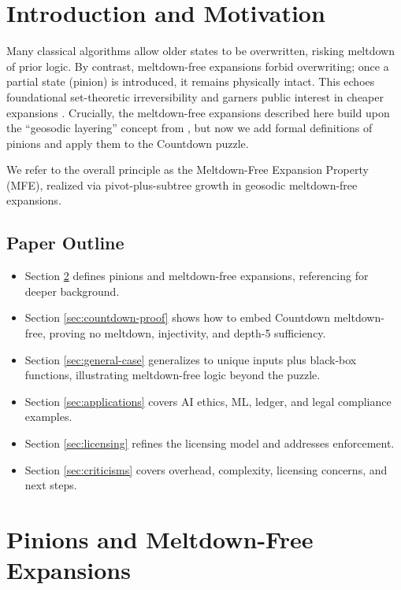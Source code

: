 \documentclass[acmsmall]{acmart}
\theoremstyle{definition}
\theoremstyle{remark}
\begin{document}
\section{Introduction and Motivation}
\label{sec:intro}
Many classical algorithms allow older states to be overwritten, risking meltdown
of prior logic. By contrast, meltdown-free expansions forbid overwriting; once
a partial state (pinion) is introduced, it remains physically intact. This echoes
foundational set-theoretic irreversibility \cite{kunen1980settheory} and garners
public interest in cheaper expansions \cite{futurism2023blog}.  
Crucially, the meltdown-free expansions described here build upon the
“geosodic layering” concept from \cite{geosodicPaper2025}, but now
we add formal definitions of pinions and apply them to the
Countdown puzzle.

We refer to the overall principle as the Meltdown-Free Expansion Property (MFE),
realized via pivot-plus-subtree growth in geosodic meltdown-free expansions.

\subsection{Paper Outline}
\begin{itemize}
\item Section \ref{sec:pinions} defines pinions and meltdown-free expansions, referencing
      \cite{geosodicPaper2025} for deeper background.
\item Section \ref{sec:countdown-proof} shows how to embed Countdown meltdown-free,
      proving no meltdown, injectivity, and depth-5 sufficiency.
\item Section \ref{sec:general-case} generalizes to unique inputs plus black-box functions,
      illustrating meltdown-free logic beyond the puzzle.
\item Section \ref{sec:applications} covers AI ethics, ML, ledger, and legal compliance examples.
\item Section \ref{sec:licensing} refines the licensing model and addresses enforcement.
\item Section \ref{sec:criticisms} covers overhead, complexity, licensing concerns,
      and next steps.
\end{itemize}

\section{Pinions and Meltdown-Free Expansions}
\label{sec:pinions}
\end{document}
